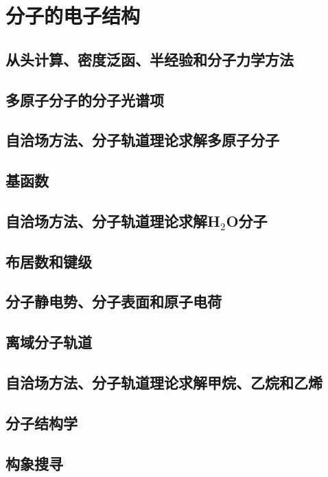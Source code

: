 \chapter{分子的电子结构}
\section{从头计算、密度泛函、半经验和分子力学方法}

\section{多原子分子的分子光谱项}

\section{自洽场方法、分子轨道理论求解多原子分子}

\section{基函数}

\section{自洽场方法、分子轨道理论求解H$_2$O分子}

\section{布居数和键级}

\section{分子静电势、分子表面和原子电荷}

\section{离域分子轨道}

\section{自洽场方法、分子轨道理论求解甲烷、乙烷和乙烯}

\section{分子结构学}

\section{构象搜寻}

